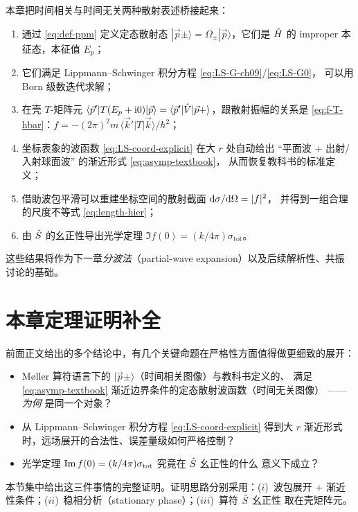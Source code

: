 本章把时间相关与时间无关两种散射表述桥接起来：
\begin{enumerate}
  \item 通过 \eqref{eq:def-ppm} 定义定态散射态 $|\vec p\pm\rangle = \Omega_\pm
        |\vec p\rangle$，它们是 $\hat{H}$ 的 improper 本征态，本征值 $E_p$；
  \item 它们满足 Lippmann--Schwinger 积分方程 \eqref{eq:LS-G-ch09}/\eqref{eq:LS-G0}，
        可以用 Born 级数迭代求解；
  \item 在壳 $T$-矩阵元 $\langle\vec p'|T(E_p+\mathrm{i} 0)|\vec p\rangle =
        \langle\vec p'|\hat{V}|\vec p+\rangle$，跟散射振幅的关系是
        \eqref{eq:f-T-hbar}：$f = -(2\pi)^2 m\,\langle\vec k'|T|\vec k\rangle/\hbar^2$；
  \item 坐标表象的波函数 \eqref{eq:LS-coord-explicit} 在大 $r$ 处自动给出
        ``平面波 + 出射/入射球面波'' 的渐近形式 \eqref{eq:asymp-textbook}，
        从而恢复教科书的标准定义；
  \item 借助波包平滑可以重建坐标空间的散射截面 $\mathrm{d}\sigma/\mathrm{d}\Omega = |f|^2$，
        并得到一组合理的尺度不等式 \eqref{eq:length-hier}；
  \item 由 $\hat{S}$ 的幺正性导出光学定理 $\Im f(0) = (k/4\pi)\sigma_{\text{tot}}$。
\end{enumerate}
这些结果将作为下一章\emph{分波法}（partial-wave expansion）以及后续解析性、共振
讨论的基础。

\section{本章定理证明补全}\label{sec:stat-proofs}

前面正文给出的多个结论中，有几个关键命题在严格性方面值得做更细致的展开：
\begin{itemize}
  \item M\o ller 算符语言下的 $|\vec p\pm\rangle$（时间相关图像）与教科书定义的、
        满足 \eqref{eq:asymp-textbook} 渐近边界条件的定态散射波函数（时间无关图像）
        ——\emph{为何} 是同一个对象？
  \item 从 Lippmann--Schwinger 积分方程 \eqref{eq:LS-coord-explicit} 得到大 $r$
        渐近形式时，远场展开的合法性、误差量级如何严格控制？
  \item 光学定理 $\Im f(0) = (k/4\pi)\sigma_{\rm tot}$ 究竟在 $\hat{S}$ 幺正性的什么
        意义下成立？
\end{itemize}
本节集中给出这三件事情的完整证明。证明思路分别采用：($i$)~波包展开 +
渐近性条件；($ii$)~稳相分析（stationary phase）；($iii$)~算符 $\hat{S}$ 幺正性
取在壳矩阵元。

